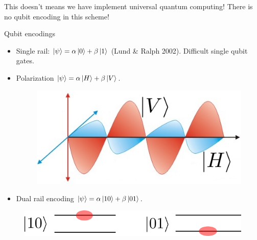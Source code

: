 \documentclass{beamer}
\begin{document}
\begin{frame}
\begin{center}

This doesn't means we have implement universal quantum computing!
There is no qubit encoding in this scheme!


\end{center}
\end{frame}

\begin{frame}{Qubit encodings}
\begin{center}

\begin{itemize}
\item Single rail: $\ket{\psi} = \alpha \ket{0} + \beta \ket{1}$ (Lund \& Ralph 2002). Difficult single qubit gates.

\item Polarization $\ket{\psi} = \alpha \ket{H} + \beta \ket{V}$.

\begin{figure}[!htb]
\centering
\includegraphics[scale=.3]{immagini/polarization.png}
\end{figure}


\item Dual rail encoding $\ket{\psi} = \alpha \ket{10} + \beta \ket{01}$.
\end{itemize}

\begin{figure}[!htb]
\centering
\includegraphics[scale=0.5]{immagini/dualRail.png}
\end{figure}

\end{center}
\end{frame}
\end{document}
